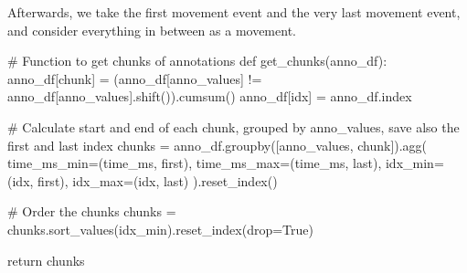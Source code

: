 \documentclass[
  letterpaper,
  DIV=11,
  numbers=noendperiod]{scrreprt}
\newenvironment{Shaded}{\begin{snugshade}}{\end{snugshade}}
\newcommand{\CommentTok}[1]{\textcolor[rgb]{0.37,0.37,0.37}{#1}}
\newcommand{\ControlFlowTok}[1]{\textcolor[rgb]{0.00,0.23,0.31}{#1}}
\newcommand{\KeywordTok}[1]{\textcolor[rgb]{0.00,0.23,0.31}{#1}}
\newcommand{\NormalTok}[1]{\textcolor[rgb]{0.00,0.23,0.31}{#1}}
\newcommand{\OperatorTok}[1]{\textcolor[rgb]{0.37,0.37,0.37}{#1}}
\newcommand{\StringTok}[1]{\textcolor[rgb]{0.13,0.47,0.30}{#1}}
\newcommand{\VariableTok}[1]{\textcolor[rgb]{0.07,0.07,0.07}{#1}}
\begin{document}
Afterwards, we take the first movement event and the very last movement
event, and consider everything in between as a movement.

\begin{Shaded}
\begin{Highlighting}[]
\CommentTok{\# Function to get chunks of annotations}
\KeywordTok{def}\NormalTok{ get\_chunks(anno\_df):}
\NormalTok{    anno\_df[}\StringTok{\textquotesingle{}chunk\textquotesingle{}}\NormalTok{] }\OperatorTok{=}\NormalTok{ (anno\_df[}\StringTok{\textquotesingle{}anno\_values\textquotesingle{}}\NormalTok{] }\OperatorTok{!=}\NormalTok{ anno\_df[}\StringTok{\textquotesingle{}anno\_values\textquotesingle{}}\NormalTok{].shift()).cumsum()}
\NormalTok{    anno\_df[}\StringTok{\textquotesingle{}idx\textquotesingle{}}\NormalTok{] }\OperatorTok{=}\NormalTok{ anno\_df.index}

    \CommentTok{\# Calculate start and end of each chunk, grouped by anno\_values, save also the first and last index}
\NormalTok{    chunks }\OperatorTok{=}\NormalTok{ anno\_df.groupby([}\StringTok{\textquotesingle{}anno\_values\textquotesingle{}}\NormalTok{, }\StringTok{\textquotesingle{}chunk\textquotesingle{}}\NormalTok{]).agg(}
\NormalTok{        time\_ms\_min}\OperatorTok{=}\NormalTok{(}\StringTok{\textquotesingle{}time\_ms\textquotesingle{}}\NormalTok{, }\StringTok{\textquotesingle{}first\textquotesingle{}}\NormalTok{),}
\NormalTok{        time\_ms\_max}\OperatorTok{=}\NormalTok{(}\StringTok{\textquotesingle{}time\_ms\textquotesingle{}}\NormalTok{, }\StringTok{\textquotesingle{}last\textquotesingle{}}\NormalTok{),}
\NormalTok{        idx\_min}\OperatorTok{=}\NormalTok{(}\StringTok{\textquotesingle{}idx\textquotesingle{}}\NormalTok{, }\StringTok{\textquotesingle{}first\textquotesingle{}}\NormalTok{),}
\NormalTok{        idx\_max}\OperatorTok{=}\NormalTok{(}\StringTok{\textquotesingle{}idx\textquotesingle{}}\NormalTok{, }\StringTok{\textquotesingle{}last\textquotesingle{}}\NormalTok{)}
\NormalTok{    ).reset\_index()}

    \CommentTok{\# Order the chunks}
\NormalTok{    chunks }\OperatorTok{=}\NormalTok{ chunks.sort\_values(}\StringTok{\textquotesingle{}idx\_min\textquotesingle{}}\NormalTok{).reset\_index(drop}\OperatorTok{=}\VariableTok{True}\NormalTok{)}

    \ControlFlowTok{return}\NormalTok{ chunks}
\end{Highlighting}
\end{Shaded}
\end{document}
